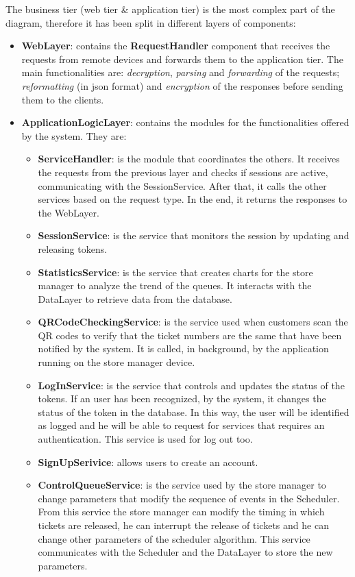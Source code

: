 The business tier (web tier \& application tier) is the most complex part of the diagram, therefore it has been split in different layers of components:
\begin{itemize}
	\item \textbf{WebLayer}: contains the \textbf{RequestHandler} component that receives the requests from remote devices and forwards them to the application tier. The main functionalities are: \textit{decryption}, \textit{parsing} and \textit{forwarding} of the requests; \textit{reformatting} (in \gls{json} format) and \textit{encryption} of the responses before sending them to the clients.
	
	\item \textbf{ApplicationLogicLayer}: contains the modules for the functionalities offered by the system. They are:
		\begin{itemize}
			\item \textbf{ServiceHandler}: is the module that coordinates the others. It receives the requests from the previous layer and checks if sessions are active, communicating with the SessionService. After that, it calls the other services based on the request type. In the end, it returns the responses to the WebLayer.
			\item \textbf{SessionService}: is the service that monitors the session by updating and releasing tokens.
			\item \textbf{StatisticsService}: is the service that creates charts for the store manager to analyze the trend of the queues. It interacts with the DataLayer to retrieve data from the database.
			\item \textbf{QRCodeCheckingService}: is the service used when customers scan the QR codes to verify that the ticket numbers are the same that have been notified by the system. It is called, in background, by the application running on the store manager device.
			\item \textbf{LogInService}: is the service that controls and updates the status of the tokens. If an user has been recognized, by the system, it changes the status of the token in the database. In this way, the user will be identified as logged and he will be able to request for services that requires an authentication.
			This service is used for log out too.
			\item \textbf{SignUpSerivice}: allows users to create an account.
			\item \textbf{ControlQueueService}: is the service used by the store manager to change parameters that modify the sequence of events in the Scheduler. From this service the store manager can modify the timing in which tickets are released, he can interrupt the release of tickets and he can change other parameters of the scheduler algorithm. This service communicates with the Scheduler and the DataLayer to store the new parameters.

\end{itemize}
\end{itemize}
